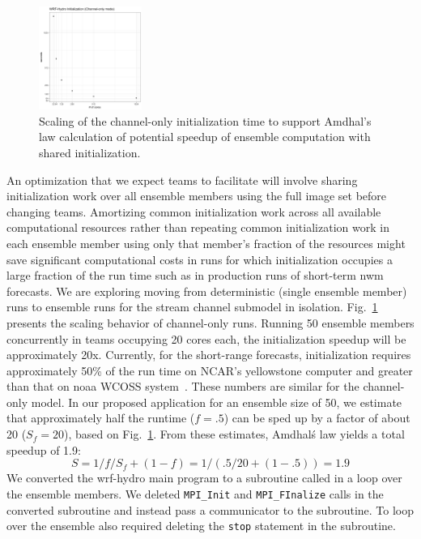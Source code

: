 \begin{figure}
\includegraphics[width=0.3\textwidth]{figures/init_timing_linear.png}
\vspace{-7pt}
\caption{Scaling of the channel-only initialization time to
  support Amdhal's law calculation of potential speedup of ensemble
  computation with shared initialization. \label{fig:wrf-hydro-init-scaling}}
\end{figure}

An optimization that we expect teams to facilitate will involve sharing initialization
work over all ensemble members using
the full image set before changing teams. Amortizing common
initialization work across all available computational resources
rather than repeating common initialization work in each
ensemble member using only that member's fraction of the resources might
save significant computational costs in runs for which
initialization occupies a large fraction of
the run time such as in production runs of short-term \gls{nwm}
forecasts. We are exploring
moving from deterministic
(single ensemble member) runs to ensemble runs for the stream
channel submodel in isolation. Fig.~\ref{fig:wrf-hydro-init-scaling}
presents the scaling behavior of channel-only runs.
Running 50 ensemble members concurrently in
teams occupying 20 cores each, the initialization speedup will be
approximately 20x. Currently, for the short-range forecasts,
initialization requires approximately 50\% of the run time on
NCAR's yellowstone computer and greater than that on \gls{noaa} WCOSS
system~\cite{yuetal2017}. These numbers are
similar for the channel-only model. In our proposed application for an ensemble size of 50, we estimate that
approximately half the runtime ($f=.5$) can be sped up by a factor of
about 20 ($S_f=20$), based on Fig.~\ref{fig:wrf-hydro-init-scaling}. From
these estimates, Amdhal\'s law yields a total speedup
of 1.9:
\begin{equation}
S = 1 / { f/S_f + (1-f) } = 1 / (.5/20 + (1-.5)) = 1.9
\end{equation}
We converted the \gls{wrf-hydro} main program to a subroutine
called in a loop over the ensemble members.
We deleted \texttt{MPI\_Init} and \texttt{MPI\_FInalize} calls in the converted
subroutine and instead pass a communicator to the subroutine.  To
loop over the ensemble also required deleting the \texttt{stop} statement in the
subroutine.

